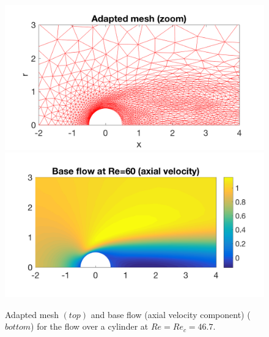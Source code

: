 \documentclass[twocolumn,10pt]{asme2ej}
\begin{document}
\begin{figure}
\includegraphics[width=.9 \linewidth]{Cylinder_Mesh.png}
\includegraphics[width=.9 \linewidth]{Cylinder_BaseFlowRe60.png}
\caption{Adapted mesh $(top)$  and base flow (axial velocity component) ($bottom$) for the flow over a cylinder at $Re=Re_c = 46.7$.}
\label{fig:Baseflow}
\end{figure}
\end{document}
